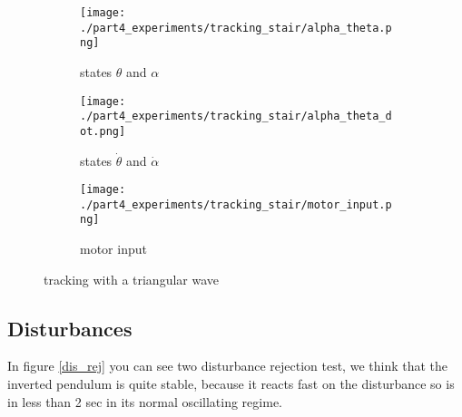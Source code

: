 
	\begin{figure}[H]
		\centering
		\begin{subfigure}[b]{0.4\textwidth}
			\texttt{[image: ./part4\_experiments/tracking\_stair/alpha\_theta.png]}
			\caption{states $\theta$ and $\alpha$}
		\end{subfigure}
		\begin{subfigure}[b]{0.4\textwidth}
			\texttt{[image: ./part4\_experiments/tracking\_stair/alpha\_theta\_dot.png]}
			\caption{states $\dot{\theta}$ and $\dot{\alpha}$}
		\end{subfigure}
		\begin{subfigure}[b]{0.4\textwidth}
			\texttt{[image: ./part4\_experiments/tracking\_stair/motor\_input.png]}
			\caption{motor input}
		\end{subfigure}
		\caption{tracking with a triangular wave}
		\label{driehoeksgolf}
	\end{figure}
	
\newpage
\subsection{Disturbances}
In figure \ref{dis_rej} you can see two disturbance rejection test, we think that the inverted pendulum is quite stable, because it reacts fast on the disturbance so is in less than 2 sec in its normal oscillating regime.

